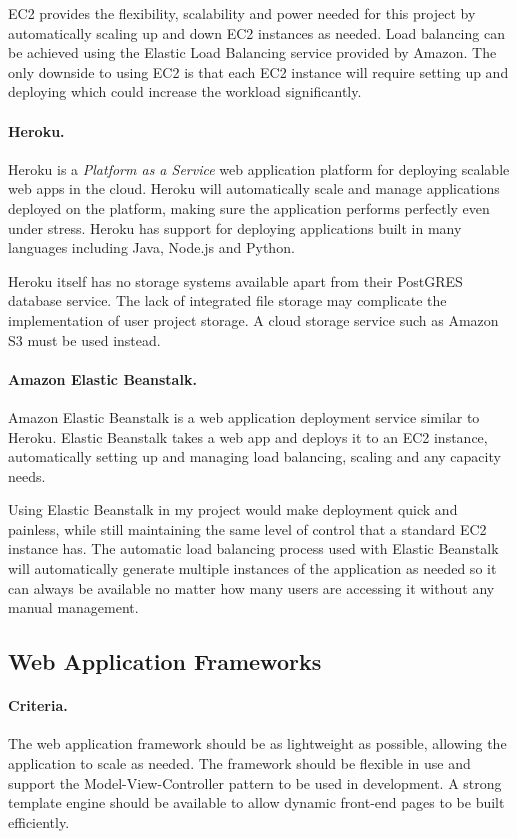 EC2 provides the flexibility, scalability and power needed for this project by automatically scaling up and down EC2 instances as needed.\cite{awsec2} Load balancing can be achieved using the Elastic Load Balancing service provided by Amazon.\cite{elasticloadbalancing} The only downside to using EC2 is that each EC2 instance will require setting up and deploying which could increase the workload significantly.

\paragraph{Heroku.}
Heroku is a \emph{Platform as a Service} web application platform for deploying scalable web apps in the cloud. Heroku will automatically scale and manage applications deployed on the platform, making sure the application performs perfectly even under stress.\cite{heroku} Heroku has support for deploying applications built in many languages including Java, Node.js and Python.

Heroku itself has no storage systems available apart from their PostGRES database service. The lack of integrated file storage may complicate the implementation of user project storage. A cloud storage service such as Amazon S3 must be used instead.

\paragraph{Amazon Elastic Beanstalk.}
Amazon Elastic Beanstalk is a web application deployment service similar to Heroku. Elastic Beanstalk takes a web app and deploys it to an EC2 instance, automatically setting up and managing load balancing, scaling and any capacity needs.\cite{awselasticbeanstalk}

Using Elastic Beanstalk in my project would make deployment quick and painless, while still maintaining the same level of control that a standard EC2 instance has. The automatic load balancing process used with Elastic Beanstalk will automatically generate multiple instances of the application as needed so it can always be available no matter how many users are accessing it without any manual management.

\subsection{Web Application Frameworks}
\paragraph{Criteria.}
The web application framework should be as lightweight as possible, allowing the application to scale as needed. The framework should be flexible in use and support the Model-View-Controller pattern to be used in development. A strong template engine should be available to allow dynamic front-end pages to be built efficiently.

